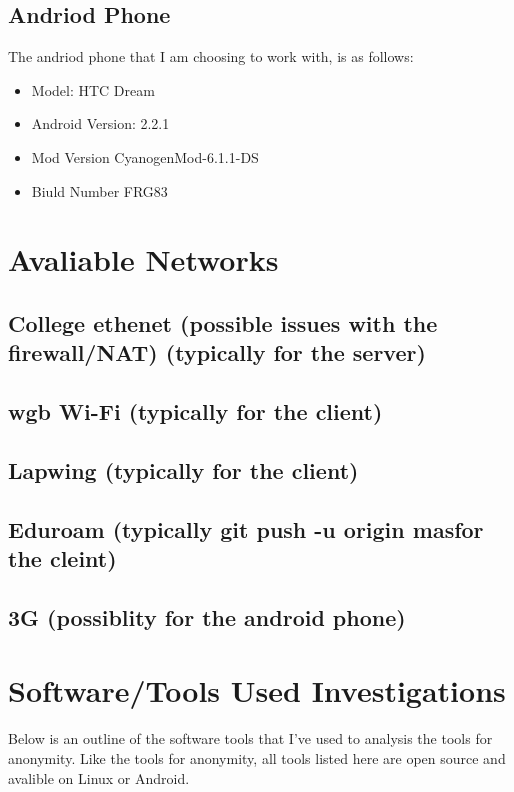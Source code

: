 \documentclass[12pt,a4paper,oneside]{article}
\begin{document}
\subsection{Andriod Phone} 
The andriod phone that I am choosing to work with, is as follows:
\begin{itemize}
\item Model: HTC Dream
\item Android Version: 2.2.1
\item Mod Version CyanogenMod-6.1.1-DS
\item Biuld Number FRG83
\end{itemize}



\section{Avaliable Networks}
\subsection{College ethenet (possible issues with the firewall/NAT) (typically for the server)}
\subsection{wgb Wi-Fi (typically for the client)}
\subsection{Lapwing (typically for the client)}
\subsection{Eduroam (typically git push -u origin masfor the cleint)}
\subsection{3G (possiblity for the android phone)}

\section{Software/Tools Used Investigations}
Below is an outline of the software tools that I've used to analysis the tools for anonymity. Like the tools for anonymity, all tools listed here are open source and avalible on Linux or Android.
\end{document}
